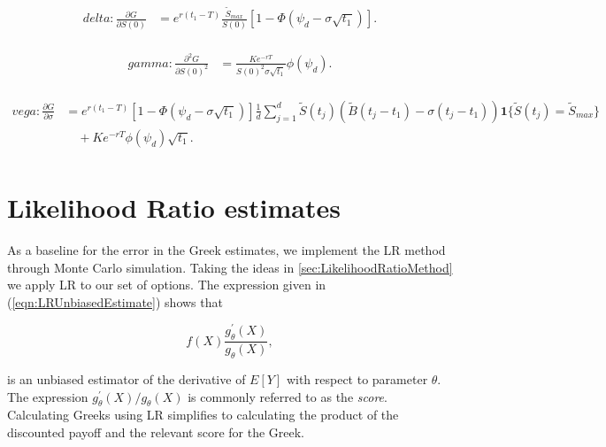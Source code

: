 \begin{equation*}
\begin{aligned}
    delta: \frac{\partial G}{\partial {S(0)}} &= e^{r(t_1 - T)} \frac{\widetilde{S}_{max}}{S(0)}\left[1 - \Phi(\psi_d - \sigma \sqrt{t_1}) \right]. \\[10pt]
\end{aligned}
\end{equation*}

\begin{equation*}
\begin{aligned}
    gamma: \frac{{\partial}^2 G}{\partial {S(0)}^2} &= \frac{Ke^{-rT}}{{S(0)}^2\sigma\sqrt{t_1}} \phi(\psi_d). \\[10pt]
\end{aligned}
\end{equation*}

\begin{equation*}
\begin{aligned}
    vega: \frac{{\partial} G}{\partial \sigma} &= e^{r(t_1 - T)} \left[1 - \Phi(\psi_d - \sigma \sqrt{t_1}) \right] \frac{1}{d}\sum_{j=1}^d{\widetilde{S}(t_j) (\widetilde{B}(t_j - t_1) - \sigma(t_j - t_1)) \boldsymbol{1}\{\widetilde{S}(t_j) = \widetilde{S}_{max}\}}\\ 
    &\quad + Ke^{-rT}\phi(\psi_d)\sqrt{t_1}. \\[10pt]
\end{aligned}
\end{equation*}

\section{Likelihood Ratio estimates}
As a baseline for the error in the Greek estimates, we implement the LR method through Monte Carlo simulation. Taking the ideas in \ref{sec:LikelihoodRatioMethod} we apply LR to our set of options. The expression given in (\ref{eqn:LRUnbiasedEstimate}) shows that

\begin{equation*}
    f(X) \frac{g^\prime_\theta(X)}{g_\theta(X)},
\end{equation*}

is an unbiased estimator of the derivative of $E[Y]$ with respect to parameter $\theta$. The expression $g^\prime_\theta(X)/g_\theta(X)$ is commonly referred to as the \textit{score}. Calculating Greeks using LR simplifies to calculating the product of the discounted payoff and the relevant score for the Greek. 

